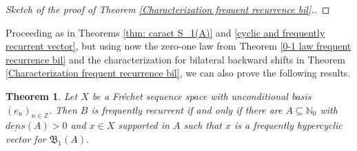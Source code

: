 \documentclass[11pt]{amsart}
\newtheorem{theorem}{Theorem}[section]
\newcommand{\zN}{\mathbb N}
\begin{document}
\begin{proof}[Sketch of the proof of Theorem \ref{Characterization frequent recurrence bil}.]

\end{proof}


Proceeding as in Theorems  \ref{thm: caract S_1(A)} and \ref{cyclic and frequently recurrent vector}, but using now the zero-one law from Theorem \ref{0-1 law frequent recurrence bil} and the characterization for bilateral backward shifts in Theorem \ref{Characterization frequent recurrence bil}, we can also prove the following results.   
\begin{theorem} \label{thm: caract S_1(A) bilat}
Let $X$ be a Fr\'echet sequence space with unconditional basis $(e_n)_{n\in \mathbb Z}$. Then $B$ is frequently recurrent if and only if there are $A\subseteq \mathbb N_0$ with $\underline {dens}(A)>0$ and $x\in X$ supported in $A$ such that $x$ is a frequently hypercyclic vector for $\mathfrak B_1(A)$. 
\end{theorem}

\end{document}
